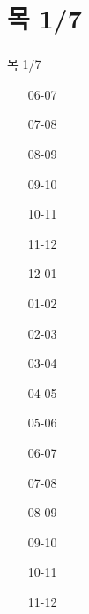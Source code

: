 \documentclass[aspectratio=1610,20pt,xcolor=pdftex,dvipsnames,table,handout]{beamer}
\begin{document}
	\section{목 1/7}											
	\begin{frame} [t,plain]											
	\frametitle{}											
		\begin{block} {목 1/7}										
		\setlength{\leftmargini}{3em}										
		\begin{itemize}										
			\item [06-07] \hrulefill									
			\item [07-08] \hrulefill									
			\item [08-09] \hrulefill									
			\item [09-10] \hrulefill									
			\item [10-11] \hrulefill									
			\item [11-12] \hrulefill									
			\item [12-01] \hrulefill									
			\item [01-02] \hrulefill									
			\item [02-03] \hrulefill									
			\item [03-04] \hrulefill									
			\item [04-05] \hrulefill									
			\item [05-06] \hrulefill									
			\item [06-07] \hrulefill									
			\item [07-08] \hrulefill									
			\item [08-09] \hrulefill									
			\item [09-10] \hrulefill									
			\item [10-11] \hrulefill									
			\item [11-12] \hrulefill									
		\end{itemize}										
		\end{block}										
	\end{frame}											
												
\end{document}
